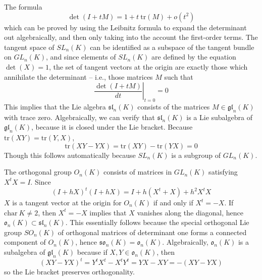 \begin{example}
    The formula
    \[ \det(I + tM) = 1 + t\ \text{tr}(M) + o(t^2) \]
    which can be proved by using the Leibnitz formula to expand the determinant out algebraically, and then only taking into the account the first-order terms. The tangent space of $SL_n(K)$ can be identified as a subspace of the tangent bundle on $GL_n(K)$, and since elements of $SL_n(K)$ are defined by the equation $\det(X) = 1$, the set of tangent vectors at the origin are exactly those which annihilate the determinant -- i.e., those matrices $M$ such that
    \[ \left. \frac{\det(I + tM)}{dt} \right|_{t = 0} = 0 \]
    This implies that the Lie algebra $\mathfrak{sl}_n(K)$ consists of the matrices $M \in \mathfrak{gl}_n(K)$ with trace zero. Algebraically, we can verify that $\mathfrak{sl}_n(K)$ is a Lie subalgebra of $\mathfrak{gl}_n(K)$, because it is closed under the Lie bracket. Because $\text{tr}(XY) = \text{tr}(Y,X)$,
    \[ \text{tr}(XY - YX) = \text{tr}(XY) - \text{tr}(YX) = 0 \]
    Though this follows automatically because $SL_n(K)$ is a subgroup of $GL_n(K)$.
\end{example}

\begin{example}
    The orthogonal group $O_n(K)$ consists of matrices in $GL_n(K)$ satisfying $X^tX = I$. Since
    \[ (I + hX)^t(I + hX) = I + h(X^t + X) + h^2X^tX \]
    $X$ is a tangent vector at the origin for $O_n(K)$ if and only if $X^t = -X$. If $\text{char}\ K \neq 2$, then $X^t = -X$ implies that $X$ vanishes along the diagonal, hence $\mathfrak{o}_n(K) \subset \mathfrak{sl}_n(K)$. This essentially follows because the special orthogonal Lie group $SO_n(K)$ of orthogonal matrices of determinant one forms a connected component of $O_n(K)$, hence $\mathfrak{so}_n(K) = \mathfrak{o}_n(K)$. Algebraically, $\mathfrak{o}_n(K)$ is a subalgebra of $\mathfrak{gl}_n(K)$ because if $X,Y \in \mathfrak{o}_n(K)$, then
    \[ (XY - YX)^t = Y^tX^t - X^tY^t = YX - XY = -(XY - YX) \]
    so the Lie bracket preserves orthogonality.
\end{example}


